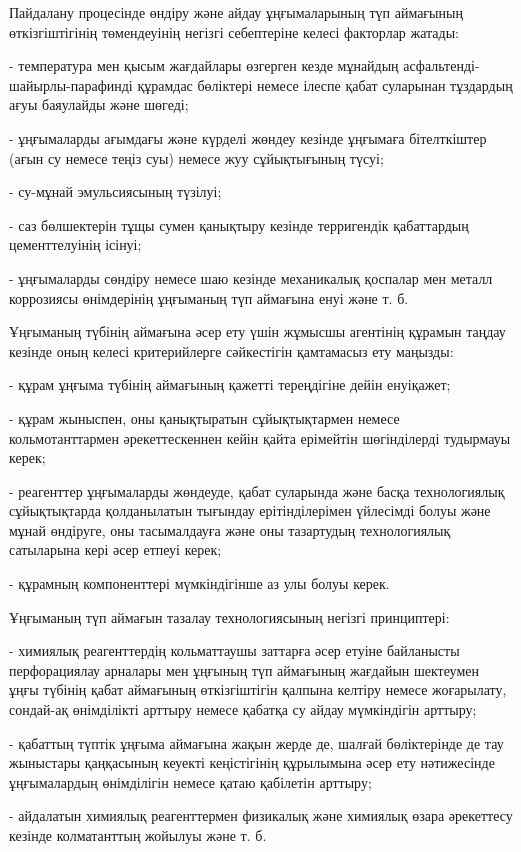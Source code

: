 \begin{multicols}{2}
Пайдалану процесінде өндіру және айдау ұңғымаларының түп аймағының
өткізгіштігінің төмендеуінің негізгі себептеріне келесі факторлар
жатады:

- температура мен қысым жағдайлары өзгерген кезде мұнайдың
асфальтенді-шайырлы-парафинді құрамдас бөліктері немесе ілеспе қабат
суларынан тұздардың ағуы баяулайды және шөгеді;

- ұңғымаларды ағымдағы және күрделі жөндеу кезінде ұңғымаға бітелткіштер
(ағын су немесе теңіз суы) немесе жуу сұйықтығының түсуі;

- су-мұнай эмульсиясының түзілуі;

- саз бөлшектерін тұщы сумен қанықтыру кезінде терригендік қабаттардың
цементтелуінің ісінуі;

- ұңғымаларды сөндіру немесе шаю кезінде механикалық қоспалар мен металл
коррозиясы өнімдерінің ұңғыманың түп аймағына енуі және т. б.

Ұңғыманың түбінің аймағына әсер ету үшін жұмысшы агентінің құрамын
таңдау кезінде оның келесі критерийлерге сәйкестігін қамтамасыз ету
маңызды:

- құрам ұңғыма түбінің аймағының қажетті тереңдігіне дейін енуіқажет;

- құрам жыныспен, оны қанықтыратын сұйықтықтармен немесе
кольмотанттармен әрекеттескеннен кейін қайта ерімейтін шөгінділерді
тудырмауы керек;

- реагенттер ұңғымаларды жөндеуде, қабат суларында және басқа
технологиялық сұйықтықтарда қолданылатын тығындау ерітінділерімен
үйлесімді болуы және мұнай өндіруге, оны тасымалдауға және оны
тазартудың технологиялық сатыларына кері әсер етпеуі керек;

- құрамның компоненттері мүмкіндігінше аз улы болуы керек.

Ұңғыманың түп аймағын тазалау технологиясының негізгі принциптері:

- химиялық реагенттердің кольматтаушы заттарға әсер етуіне байланысты
перфорациялау арналары мен ұңғының түп аймағының жағдайын шектеумен ұңғы
түбінің қабат аймағының өткізгіштігін қалпына келтіру немесе жоғарылату,
сондай-ақ өнімділікті арттыру немесе қабатқа су айдау мүмкіндігін
арттыру;

- қабаттың түптік ұңғыма аймағына жақын жерде де, шалғай бөліктерінде де
тау жыныстары қаңқасының кеуекті кеңістігінің құрылымына әсер ету
нәтижесінде ұңғымалардың өнімділігін немесе қатаю қабілетін арттыру;

- айдалатын химиялық реагенттермен физикалық және химиялық өзара
әрекеттесу кезінде колматанттың жойылуы және т. б.


\end{multicols}
